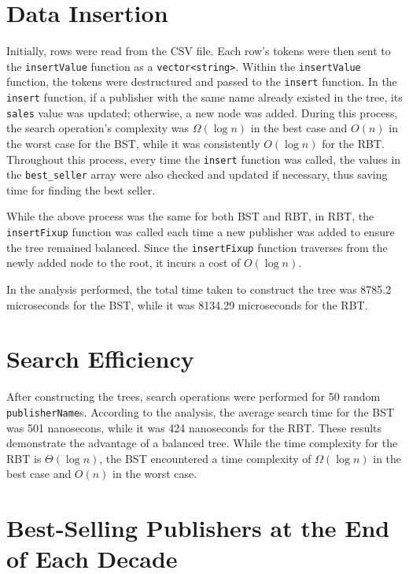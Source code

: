 \label{implementation}

\section{Data Insertion}
Initially, rows were read from the CSV file. Each row's tokens were then sent to the \texttt{insertValue} function as a \texttt{vector<string>}. Within the \texttt{insertValue} function, the tokens were destructured and passed to the \texttt{insert} function. In the \texttt{insert} function, if a publisher with the same name already existed in the tree, its \texttt{sales} value was updated; otherwise, a new node was added. During this process, the search operation's complexity was $\Omega(\log n)$ in the best case and $O(n)$ in the worst case for the BST, while it was consistently $O(\log n)$ for the RBT. Throughout this process, every time the \texttt{insert} function was called, the values in the \texttt{best\_seller} array were also checked and updated if necessary, thus saving time for finding the best seller.

While the above process was the same for both BST and RBT, in RBT, the \texttt{insertFixup} function was called each time a new publisher was added to ensure the tree remained balanced. Since the \texttt{insertFixup} function traverses from the newly added node to the root, it incurs a cost of $O(\log n)$.

In the analysis performed, the total time taken to construct the tree was 8785.2 microseconds for the BST, while it was 8134.29 microseconds for the RBT.

\section{Search Efficiency}
After constructing the trees, search operations were performed for 50 random \texttt{publisherName}s. According to the analysis, the average search time for the BST was 501 nanosecons, while it was 424 nanoseconds for the RBT. These results demonstrate the advantage of a balanced tree. While the time complexity for the RBT is $\Theta(\log n)$, the BST encountered a time complexity of $\Omega(\log n)$ in the best case and $O(n)$ in the worst case.

\section{Best-Selling Publishers at the End of Each Decade}

